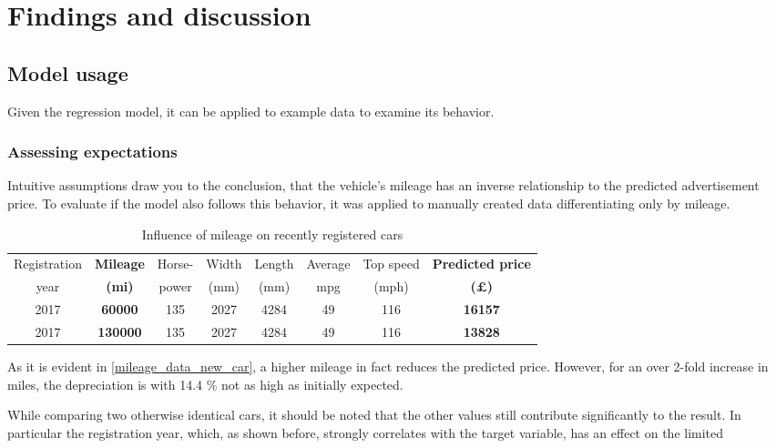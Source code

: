 \chapter{Findings and discussion}
\section{Model usage}\label{model_usage_section}
Given the regression model, it can be applied to example data to examine its behavior.
\subsection{Assessing expectations}
Intuitive assumptions draw you to the conclusion, that the vehicle's mileage has an inverse relationship to the predicted advertisement price.
To evaluate if the model also follows this behavior, it was applied to manually created data differentiating only by mileage.
\begin{table}[H]
    \begin{adjustbox}{width={\textwidth}}
        \begin{tabular}{|c|c|c|c|c|c|c|c|}
            \hline
            Registration & \textbf{Mileage} & Horse- & Width & Length & Average & Top speed & \textbf{Predicted price} \\[-1ex]
            year         & \textbf{(mi)}    & power  & (mm)  & (mm)   & mpg     & (mph)     & \textbf{(£)}             \\ \hline
            2017         & \textbf{60000}   & 135    & 2027  & 4284   & 49      & 116       & \textbf{16157}           \\\hline
            2017         & \textbf{130000}  & 135    & 2027  & 4284   & 49      & 116       & \textbf{13828}           \\\hline
        \end{tabular}
    \end{adjustbox}
    \caption{Influence of mileage on recently registered cars}
    \label{mileage_data_new_car}
\end{table}
As it is evident in \autoref{mileage_data_new_car}, a higher mileage in fact reduces the predicted price.
However, for an over 2-fold increase in miles, the depreciation is with 14.4 \% not as high as initially expected.
\par
While comparing two otherwise identical cars, it should be noted that the other values still contribute significantly to the
result.
\newline
In particular the registration year, which, as shown before, strongly correlates with the target variable, has an effect on the limited
